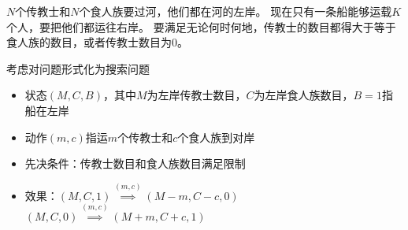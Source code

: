 \begin{example}
$N$个传教士和$N$个食人族要过河，他们都在河的左岸。
现在只有一条船能够运载$K$个人，要把他们都运往右岸。
要满足无论何时何地，传教士的数目都得大于等于食人族的数目，或者传教士数目为0。
\end{example}
\begin{analysis}
考虑对问题形式化为搜索问题
\begin{itemize}
	\item 状态$(M,C,B)$，其中$M$为左岸传教士数目，$C$为左岸食人族数目，$B=1$指船在左岸
	\item 动作$(m,c)$指运$m$个传教士和$c$个食人族到对岸
	\item 先决条件：传教士数目和食人族数目满足限制
	\item 效果：$(M,C,1)\stackrel{(m,c)}{\implies}(M-m,C-c,0)$\\
	$(M,C,0)\stackrel{(m,c)}{\implies}(M+m,C+c,1)$
\end{itemize}
\end{analysis}